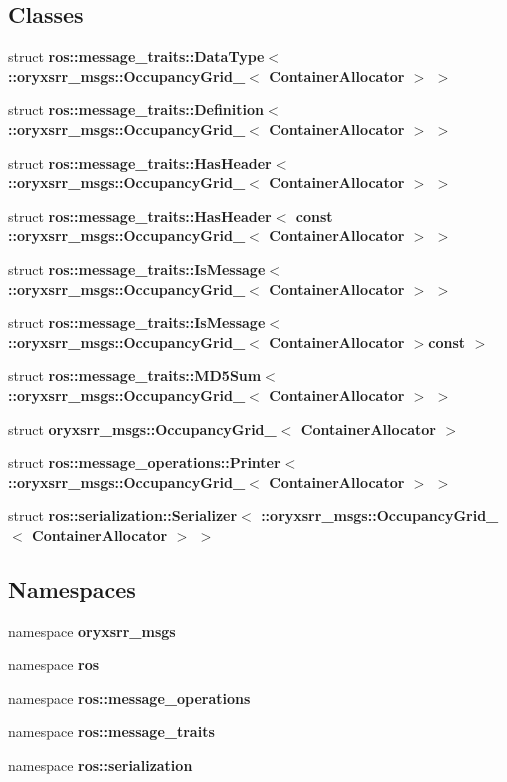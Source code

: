 \subsection*{\-Classes}
\begin{DoxyCompactItemize}
\item 
struct {\bf ros\-::message\-\_\-traits\-::\-Data\-Type$<$ \-::oryxsrr\-\_\-msgs\-::\-Occupancy\-Grid\-\_\-$<$ Container\-Allocator $>$ $>$}
\item 
struct {\bf ros\-::message\-\_\-traits\-::\-Definition$<$ \-::oryxsrr\-\_\-msgs\-::\-Occupancy\-Grid\-\_\-$<$ Container\-Allocator $>$ $>$}
\item 
struct {\bf ros\-::message\-\_\-traits\-::\-Has\-Header$<$ \-::oryxsrr\-\_\-msgs\-::\-Occupancy\-Grid\-\_\-$<$ Container\-Allocator $>$ $>$}
\item 
struct {\bf ros\-::message\-\_\-traits\-::\-Has\-Header$<$ const \-::oryxsrr\-\_\-msgs\-::\-Occupancy\-Grid\-\_\-$<$ Container\-Allocator $>$ $>$}
\item 
struct {\bf ros\-::message\-\_\-traits\-::\-Is\-Message$<$ \-::oryxsrr\-\_\-msgs\-::\-Occupancy\-Grid\-\_\-$<$ Container\-Allocator $>$ $>$}
\item 
struct {\bf ros\-::message\-\_\-traits\-::\-Is\-Message$<$ \-::oryxsrr\-\_\-msgs\-::\-Occupancy\-Grid\-\_\-$<$ Container\-Allocator $>$const  $>$}
\item 
struct {\bf ros\-::message\-\_\-traits\-::\-M\-D5\-Sum$<$ \-::oryxsrr\-\_\-msgs\-::\-Occupancy\-Grid\-\_\-$<$ Container\-Allocator $>$ $>$}
\item 
struct {\bf oryxsrr\-\_\-msgs\-::\-Occupancy\-Grid\-\_\-$<$ Container\-Allocator $>$}
\item 
struct {\bf ros\-::message\-\_\-operations\-::\-Printer$<$ \-::oryxsrr\-\_\-msgs\-::\-Occupancy\-Grid\-\_\-$<$ Container\-Allocator $>$ $>$}
\item 
struct {\bf ros\-::serialization\-::\-Serializer$<$ \-::oryxsrr\-\_\-msgs\-::\-Occupancy\-Grid\-\_\-$<$ Container\-Allocator $>$ $>$}
\end{DoxyCompactItemize}
\subsection*{\-Namespaces}
\begin{DoxyCompactItemize}
\item 
namespace {\bf oryxsrr\-\_\-msgs}
\item 
namespace {\bf ros}
\item 
namespace {\bf ros\-::message\-\_\-operations}
\item 
namespace {\bf ros\-::message\-\_\-traits}
\item 
namespace {\bf ros\-::serialization}
\end{DoxyCompactItemize}
